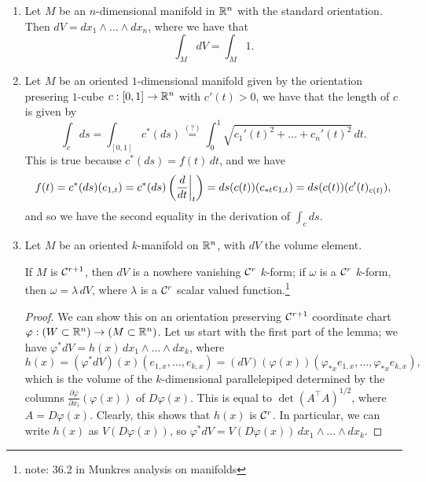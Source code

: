 \begin{enumerate}[label=(\roman*)]
    \item Let $M$ be an $n$-dimensional manifold in $\mathbb R^n$ with the standard orientation. Then $dV = dx_1 \wedge \dots \wedge dx_n$, where we have that
    \[ \int_M dV = \int_M 1. \]
    \item Let $M$ be an oriented $1$-dimensional manifold given by the orientation presering $1$-cube $c : [0, 1] \to \mathbb R^n$ with $c'(t) > 0$, we have that the length of $c$ is given by
    \[ \int_c ds = \int_{[0, 1]} c^\ast(ds) \stackrel{(?)}{=} \int_0^1 \sqrt{c_1'(t)^2 + \dots + c_n'(t)^2} \, dt. \]
    This is true because $c^\ast (ds) = f(t) \, dt$, and we have
    \[ f(t) = c^\ast(ds)(e_{1,t}) = c^\ast(ds)\left(\restr{\frac{d}{dt}}{t}\right)  = ds(c(t))(c_{\ast t} e_{1,t})  = ds(c(t))(c'(t)_{c(t)}), \]
    and so we have the second equality in the derivation of $\int_c ds$.
    \item Let $M$ be an oriented $k$-manifold on $\mathbb R^n$, with $dV$ the volume element.
    \begin{simplelemma}
        If $M$ is $\mathcal C^{r+1}$, then $dV$ is a nowhere vanishing $\mathcal C^r$ $k$-form; if $\omega$ is a $\mathcal C^r$ $k$-form, then $\omega = \lambda \, dV$, where $\lambda$ is a $\mathcal C^r$ scalar valued function.\footnote{note: 36.2 in Munkres analysis on manifolds}
    \end{simplelemma}
    \begin{proof}
        We can show this on an orientation preserving $\mathcal C^{r+1}$ coordinate chart $\varphi : (W \subset \mathbb R^n) \to (M \subset \mathbb R^n)$. Let us start with the first part of the lemma; we have $\varphi^\ast dV = h(x) \, dx_1 \wedge \dots \wedge dx_k$, where
        \[ h(x) = (\varphi^\ast dV) (x) (e_{1, x}, \dots, e_{k, x}) = (dV) (\varphi(x)) (\varphi_{\ast x} e_{1, x}, \dots, \varphi_{\ast x} e_{k, x}), \]
        which is the volume of the $k$-dimensional parallelepiped determined by the columns $\frac{\partial \varphi}{\partial x_i}(\varphi(x))$ of $D\varphi(x)$. This is equal to $\det (A^\top A)^{1/2}$, where $A = D\varphi(x)$. Clearly, this shows that $h(x)$ is $\mathcal C^r$. In particular, we can write $h(x)$ as $V(D\varphi(x))$, so $\varphi^\ast dV = V(D\varphi(x)) \, dx_1 \wedge \dots \wedge dx_k$. %

\end{proof}
\end{enumerate}
